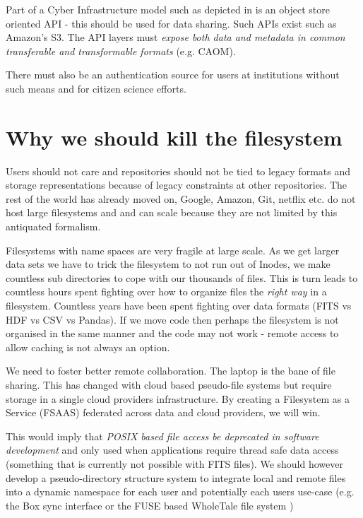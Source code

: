 Part of a Cyber Infrastructure model such as depicted in  is an object store oriented \gls{API} - this should be used for data sharing. Such APIs exist such as Amazon's S3.
The  \gls{API} layers must \emph{expose both data and \gls{metadata} in common
transferable and transformable formats} (e.g. \gls{CAOM}).


There must also be an authentication source for users at institutions without such means and for citizen science efforts.

\section{Why we should kill the filesystem}

Users should not care and repositories should not be tied to legacy formats  and storage representations because of legacy constraints  at other repositories.
The rest of the world has already moved on,  Google, Amazon, Git, netflix etc. do not host large filesystems and and can scale because they are not limited by this antiquated formalism.

Filesystems with name spaces are very fragile at large scale. As we get larger data sets we have to trick the filesystem to not run out of Inodes, we make countless sub directories to cope with our thousands of files.
This is turn leads to countless hours spent fighting over how to organize files  the \emph{right way} in a filesystem.
Countless years have been spent fighting over data formats (\gls{FITS} vs \gls{HDF} vs \gls{CSV} vs Pandas).
If we move code then perhaps the filesystem is not organised in the same manner and the code may not work - remote access to allow caching is not always an option.

We need to foster better remote collaboration.  The laptop is the bane of file sharing.
This has changed with cloud based pseudo-file systems but require storage in a single
cloud providers infrastructure. By creating a Filesystem as a Service (\gls{FSAAS}) federated
across data and cloud providers, we will win.

This would imply that \emph{POSIX based file access be deprecated
in software development} and only used when applications require thread safe
data access (something that is currently not possible with \gls{FITS} files).
We should however  develop a pseudo-directory structure system to
integrate local and remote files into a dynamic namespace for each user and potentially
each users use-case (e.g. the Box sync interface or the \gls{FUSE} based WholeTale file system
\citep{BRINCKMAN2019854})


